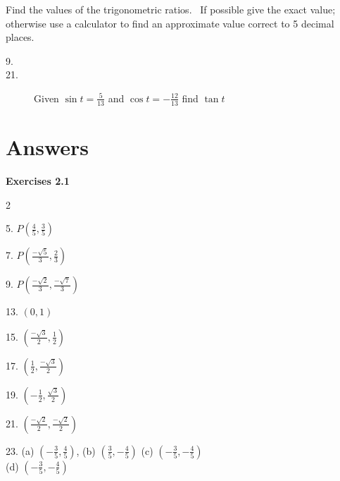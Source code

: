 Find the values of the trigonometric ratios.
\ If possible give the exact value; otherwise use a calculator to find an approximate value correct to 5 decimal
places. 


\begin{description}
\item [9.]   
\columnsep =30pt
 

\item [21.]
Given $\sin  t =\frac{5}{13}$ and $\cos  t = -\frac{12}{13}$ find $\tan  t$ \end{description}

\section{Answers}
\textbf{Exercises 2.1} 

\begin {multicols}{2}

5. $P \left (\frac{4}{5} ,\frac{3}{5}\right )$ 

7. $P \left (\frac{ -\sqrt{5}}{3} ,\frac{2}{3}\right )$ 

9. $P \left (\frac{ -\sqrt{2}}{3} ,\frac{ -\sqrt{7}}{3}\right )$ 

13. $\left (0 ,1\right )$ 

15. $\left (\frac{ -\sqrt{3}}{2} ,\frac{1}{2}\right )$ 

17. $\left (\frac{1}{2} ,\frac{ -\sqrt{3}}{2}\right )$ 

19. $\left ( -\frac{1}{2} ,\frac{\sqrt{3}}{2}\right )$ 

21. $\left (\frac{ -\sqrt{2}}{2} ,\frac{ -\sqrt{2}}{2}\right )$ 

23. (a) $\left ( -\frac{3}{5} ,\frac{4}{5}\right )$, (b) $\left (\frac{3}{5} , -\frac{4}{5}\right )$ (c) $\left ( -\frac{3}{5} , -\frac{4}{5}\right )$  \\\relax (d)
$\left ( -\frac{3}{5} , -\frac{4}{5}\right )$ 

\end{multicols}

